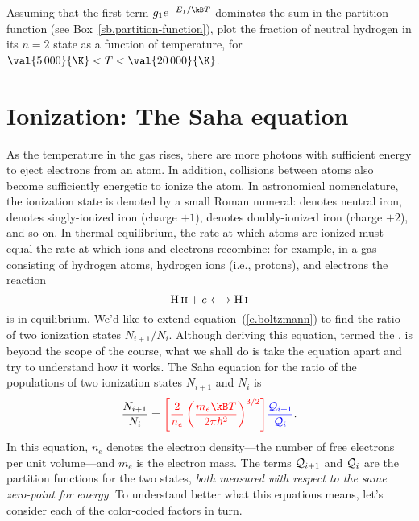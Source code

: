 \begin{exercisebox}
Assuming that the first term $g_{1}e^{-E_{1}/\kB T}$ dominates the sum in the partition function (see Box~\ref{sb.partition-function}), plot the fraction of neutral hydrogen in its $n=2$ state as a function of temperature, for $\val{5\,000}{\K} < T < \val{20\,000}{\K}$.
\end{exercisebox}

\section{Ionization: The Saha equation}
\label{s.saha-eqn}

As the temperature in the gas rises, there are more photons with sufficient energy to eject electrons from an atom. In addition, collisions between atoms also become sufficiently energetic to ionize the atom. In astronomical nomenclature, the ionization state is denoted by a small Roman numeral:  denotes neutral iron,  denotes singly-ionized iron (charge $+1$),  denotes doubly-ionized iron (charge $+2$), and so on. In thermal equilibrium, the rate at which atoms are ionized must equal the rate at which ions and electrons recombine: for example, in a gas consisting of hydrogen atoms, hydrogen ions (i.e., protons), and electrons the reaction
\[
	\mathrm{H}\,\textrm{\scshape ii} + e \longleftrightarrow \mathrm{H}\,\textrm{\scshape i}
\]
is in equilibrium. We'd like to extend equation~(\ref{e.boltzmann}) to find the ratio of two ionization states $N_{i+1}/N_{i}$. Although deriving this equation, termed the , is beyond the scope of the course, what we shall do is take the equation apart and try to understand how it works.  The Saha equation for the ratio of the populations of two ionization states
$N_{i+1}$ and $N_{i}$ is
\begin{equation}\label{e.saha}
\frac{N_{i+1}}{N_{i}} 
= {\color{red}\left[\frac{2}{n_{e}}
\left(\frac{m_{e}\kB T}{2\pi\hbar^{2}}\right)^{3/2}\right]}
{\color{blue}\frac{\pfcn_{i+1}}{\pfcn_{i}}}.
\end{equation}
In this equation, $n_{e}$ denotes the electron density---the number of free electrons per unit volume---and $m_{e}$ is the electron mass. The terms $\mathcal{Q}_{i+1}$ and $\mathcal{Q}_{i}$ are the partition functions for the two states, \emph{both measured with respect to the same zero-point for energy}. To understand better what this equations means, let's consider each of the color-coded factors in turn.

